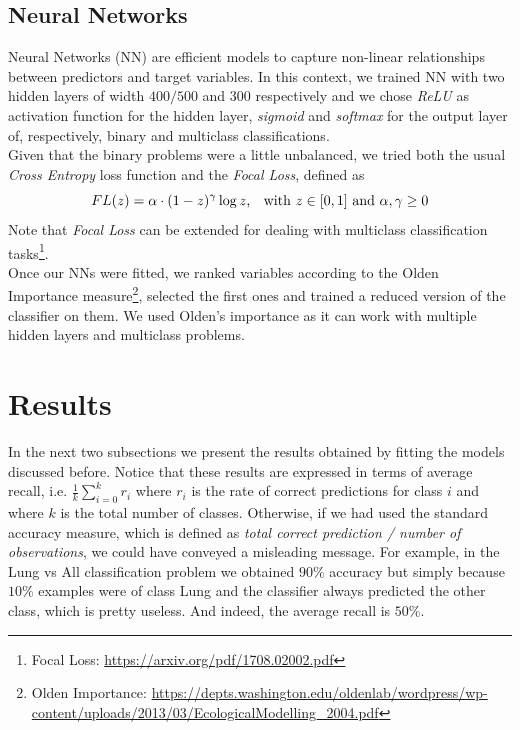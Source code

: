 \documentclass[a4paper,11pt, oneside]{article}  %
\begin{document}
	\subsection{Neural Networks}
	Neural Networks (NN) are efficient models to capture non-linear relationships between predictors and target variables. In this context, we trained NN with two hidden layers of width $400/500$ and $300$ respectively and we chose \textit{ReLU} as activation function for the hidden layer, \textit{sigmoid} and \textit{softmax} for the output layer of, respectively, binary and multiclass classifications. \\
	Given that the binary problems were a little unbalanced, we tried both the usual \textit{Cross Entropy} loss function and the \textit{Focal Loss}, defined as 
	\begin{equation*}
		FL(z) = \alpha \cdot (1 - z)^{\gamma} \log{z} \text{,  \hspace{3pt} with }z \in [0,1]  \text{ and } \alpha,  \gamma \geq 0
	\end{equation*}
	Note that \textit{Focal Loss} can be extended for dealing with multiclass classification tasks\footnote{Focal Loss: \url{https://arxiv.org/pdf/1708.02002.pdf}}. \\
	Once our NNs were fitted,  we ranked variables according to the Olden Importance measure\footnote{Olden Importance: \url{https://depts.washington.edu/oldenlab/wordpress/wp-content/uploads/2013/03/EcologicalModelling_2004.pdf}}, selected the first ones and trained a reduced version of the classifier on them. We used Olden's importance as it can work with multiple hidden layers and multiclass problems. 
	
	\section{Results}
In the next two subsections we present the results obtained by fitting the models discussed before.  Notice that these results are expressed in terms of average recall,  i.e.  
$\frac{1}{k} \sum\limits_{i = 0 }^k r_i$
where $r_i$ is the rate of correct predictions for class $i$ and where $k$ is the total number of classes.  Otherwise,  if we had used the standard accuracy measure,  which is defined as \textit{total correct prediction / number of observations},  we could have conveyed a misleading message.  For example,  in the Lung vs All classification problem we obtained $90 \%$ accuracy but simply because $10\%$ examples were of class Lung and the classifier always predicted the other class, which is pretty useless.  And indeed,  the average recall is $50 \%$.
	
\end{document}
